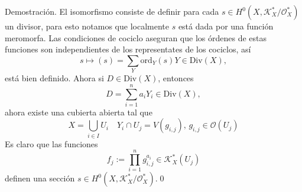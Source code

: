 \documentclass[letterpaper]{article}
\newcommand{\dem}{{\noindent \sc Demostraci\'on. }}
\newcommand{\Div}{\ensuremath{\mathrm{Div}}}
\newcommand{\ord}{\ensuremath{\mathrm{ord}}}
\begin{document}
\dem El isomorfismo consiste de definir para cada \(s\in H^{0}(X,\mathcal{K}^{*}_{X}/\mathcal{O}^{*}_{X})\) un divisor, para esto notamos que localmente \(s\) está dada por una función meromorfa. Las condiciones de cociclo aseguran que los órdenes de estas funciones son independientes de los representates de los cociclos, así
\[
  s\mapsto (s)=\sum_{Y}\ord_{Y}(s)Y\in\Div(X),
\]
\noindent está bien definido. Ahora si \(D\in\Div(X)\), entonces
\[
  D=\sum^{n}_{i=1}a_{i}Y_{i}\in\Div(X),
\]
\noindent ahora existe una cubierta abierta tal que
\[
  X=\bigcup_{i\in I}U_{i}\quad Y_{i}\cap U_{j}=V(g_{i,j}),\,g_{i,j}\in\mathcal{O}(U_{j})
\]
Es claro que las funciones
\[
  f_{j}:=\prod^{n}_{i=1}g^{a_{i}}_{i,j}\in\mathcal{K}^{*}_{X}(U_{j})
\]
\noindent definen una sección \(s\in H^{0}(X,\mathcal{K}^{*}_{X}/\mathcal{O}^{*}_{X})\).\qed
\end{document}
